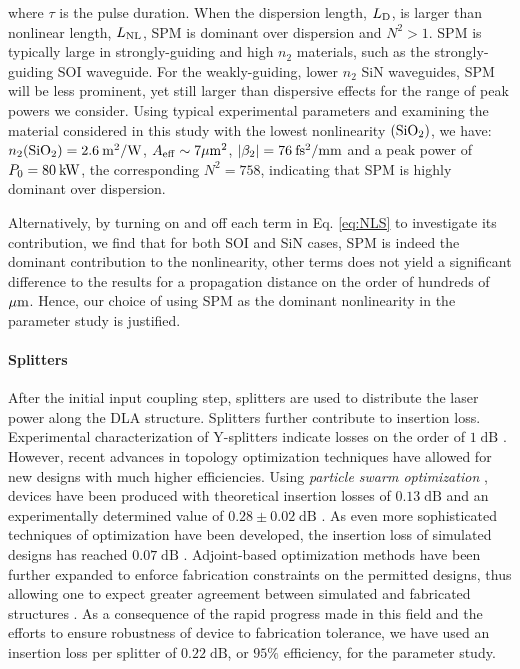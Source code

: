 where $\tau$ is the pulse duration. When the dispersion length, $L_{\rm{D}}$, is larger than nonlinear length, $L_{\rm{NL}}$, SPM is dominant over dispersion and $N^2 > 1$. SPM is typically large in strongly-guiding and high $n_2$ materials, such as the strongly-guiding SOI waveguide. For the weakly-guiding, lower $n_2$ SiN waveguides, SPM will be less prominent, yet still larger than dispersive effects for the range of peak powers we consider. Using typical experimental parameters and examining the material considered in this study with the lowest nonlinearity $(\rm{SiO_2})$, we have: $n_2(\rm{SiO_2})=2.6\:m^2/W$, $A_{\rm{eff}}\sim 7\rm{\mu m^2}$, $|\beta_2| = 76\:\rm{fs^2/mm}$ and a peak power of $P_0=80\:\rm{kW}$, the corresponding $N^2=758$, indicating that SPM is highly dominant over dispersion. 

Alternatively, by turning on and off each term in Eq. \ref{eq:NLS} to investigate its contribution, we find that for both SOI and SiN cases, SPM is indeed the dominant contribution to the nonlinearity, other terms does not yield a significant difference to the results for a propagation distance on the order of hundreds of $\rm{\mu m}$. Hence, our choice of using SPM as the dominant nonlinearity in the parameter study is justified.

\paragraph{Splitters}

After the initial input coupling step, splitters are used to distribute the laser power along the DLA structure.
Splitters further contribute to insertion loss.
Experimental characterization of Y-splitters indicate losses on the order of $1\;\text{dB}$ \cite{zhang2013compact}.
However, recent advances in topology optimization techniques have allowed for new designs with much higher efficiencies.
Using \textit{particle swarm optimization} \cite{eberhart1995new}, devices have been produced with theoretical insertion losses of $0.13\;\text{dB}$ and an experimentally determined value of $0.28 \pm 0.02\;\text{dB}$ \cite{zhang2013compact}.
As even more sophisticated techniques of optimization have been developed, the insertion loss of simulated designs has reached $0.07\;\text{dB}$ \cite{lalau2013adjoint}.
Adjoint-based optimization methods have been further expanded to enforce fabrication constraints on the permitted designs, thus allowing one to expect greater agreement between simulated and fabricated structures \cite{piggott2017fabrication}.
As a consequence of the rapid progress made in this field and the efforts to ensure robustness of device to fabrication tolerance, we have used an insertion loss per splitter of $0.22\;\text{dB}$, or $95\%$ efficiency, for the parameter study.

